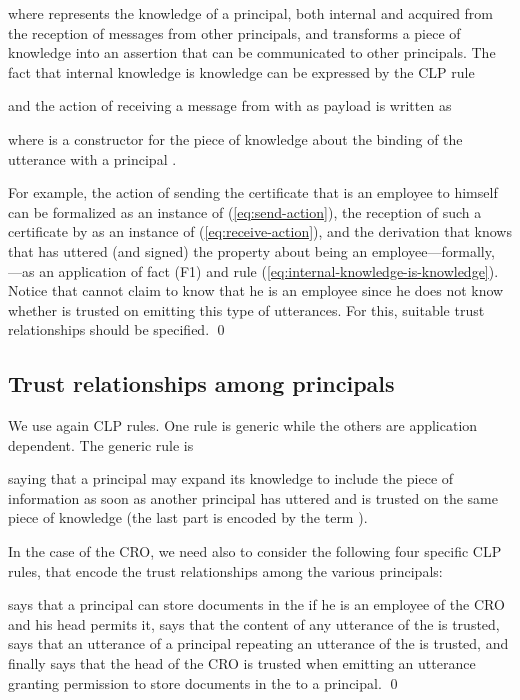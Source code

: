 \documentclass[conference]{llncs}
\newcommand{\CRO}{CRO}
\begin{document}
where  represents the knowledge of a principal, both
internal and acquired from the reception of messages from other
principals, and  transforms a piece of knowledge into an
assertion that can be communicated to other principals.  The fact that
internal knowledge is knowledge can be expressed by the CLP rule

and the action of  receiving a message from  with  as payload
is written as

where  is a constructor for the piece of knowledge about the
binding of the utterance  with a principal .  
\begin{example}
\label{ex:certs}
For example, the action of  sending the certificate that 
is an employee to  himself can be formalized as an instance of
(\ref{eq:send-action}), the reception of such a certificate by 
as an instance of (\ref{eq:receive-action}), and the derivation that
 knows that  has uttered (and signed) the property about
 being an employee---formally,
---as an
application of fact (F1) and rule
(\ref{eq:internal-knowledge-is-knowledge}).
Notice that  cannot claim to know that he is an employee since he
does not know whether  is trusted on emitting this type of
utterances.  For this, suitable trust relationships should be
specified. \qed
\end{example}

\subsection{Trust relationships among principals} 
\label{subsec:trustrelations}
We use again CLP rules.
One rule is generic while the others are application dependent. The generic rule is

saying that a principal  may expand its knowledge to include the
piece of information  as soon as another principal  has uttered
 and  is trusted on the same piece of
knowledge  (the last part is encoded by the term
).

\begin{example}
\label{ex:rules}
In the case of the \CRO{}, we need also to consider the following four
specific CLP rules, that encode the trust relationships among the
various principals:


 says that a principal  can store documents in the  if he
is an employee of the \CRO{} and his head permits it, 
says that the content of any utterance of the  is trusted, 
 says that an utterance of
a principal repeating an utterance of the  is trusted, and finally 
 says that the head of the \CRO{} is trusted when emitting an utterance
granting permission to store documents in the  to a principal.
\qed
\end{example}
\end{document}
